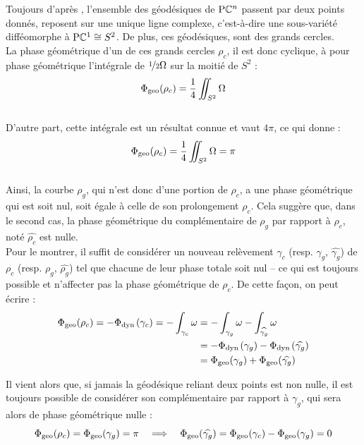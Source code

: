 Toujours d'après \cite[sec.~3.E]{besse_manifolds_1978}, l'ensemble des géodésiques de $\text{\normalfont P}\mathbb{C}^{n}$ passent par deux points donnés, reposent sur une unique ligne complexe, c'est-à-dire une sous-variété difféomorphe à $\text{\normalfont P}\mathbb{C}^{1}\cong S^2$. De plus, ces géodésiques, sont des grands cercles.
\\

La phase géométrique d'un de ces grands cercles $\rho_c$, il est donc cyclique, à pour phase géométrique l'intégrale de $\nicefrac{1}{2} \Omega$ sur la moitié de $S^2$ :
\[\Phi_{\text{\normalfont geo}}(\rho_c) = \frac{1}{4} \iint_{S^2} \Omega\]
\\
D'autre part, cette intégrale est un résultat connue \cite[p. 119]{huybrechts_complex_2005} et vaut $4\pi$, ce qui donne :
\[\Phi_{\text{\normalfont geo}}(\rho_c) = \frac{1}{4} \iint_{S^2} \Omega = \pi\]
\\
Ainsi, la courbe $\rho_g$, qui n'est donc d'une portion de $\rho_c$, a une phase géométrique qui est soit nul, soit égale à celle de son prolongement $\rho_c$. 
Cela suggère que, dans le second cas, la phase géométrique du complémentaire de $\rho_g$ par rapport à $\rho_c$, noté $\widehat{\rho_c}$ est nulle. 
\\
Pour le montrer, il suffit de considérer un nouveau relèvement $\gamma_c$ (resp. $\gamma_g$, $\widehat{\gamma_g}$) de $\rho_c$ (resp. $\rho_g$, $\widehat{\rho_g}$) tel que chacune de leur phase totale soit nul -- ce qui est toujours possible et n'affecter pas la phase géométrique de $\rho_c$. De cette façon, on peut écrire :
\begin{align*}
	\Phi_{\text{\normalfont geo}}(\rho_c) = -\Phi_{\text{\normalfont dyn}\, }(\gamma_c) = -\int_{\gamma_c}\omega 
	&= -\int_{\gamma_g}\omega -\int_{\widehat{\gamma_g}}\omega \\
	&= -\Phi_{\text{\normalfont dyn}\, }(\gamma_g) - \Phi_{\text{\normalfont dyn}\, }(\widehat{\gamma_g}) \\
	&= \Phi_{\text{\normalfont geo}}(\gamma_g) + \Phi_{\text{\normalfont geo}}(\widehat{\gamma_g})
\end{align*}
\skipl

Il vient alors que, si jamais la géodésique reliant deux points est non nulle, il est toujours possible de considérer son complémentaire par rapport à $\gamma_g$, qui sera alors de phase géométrique nulle :
\[\Phi_{\text{\normalfont geo}}(\rho_c) = \Phi_{\text{\normalfont geo}}(\gamma_g) = \pi \quad \Longrightarrow\quad \Phi_{\text{\normalfont geo}}(\widehat{\gamma_g}) = \Phi_{\text{\normalfont geo}}(\gamma_c) - \Phi_{\text{\normalfont geo}}(\gamma_g) = 0\]
\\

